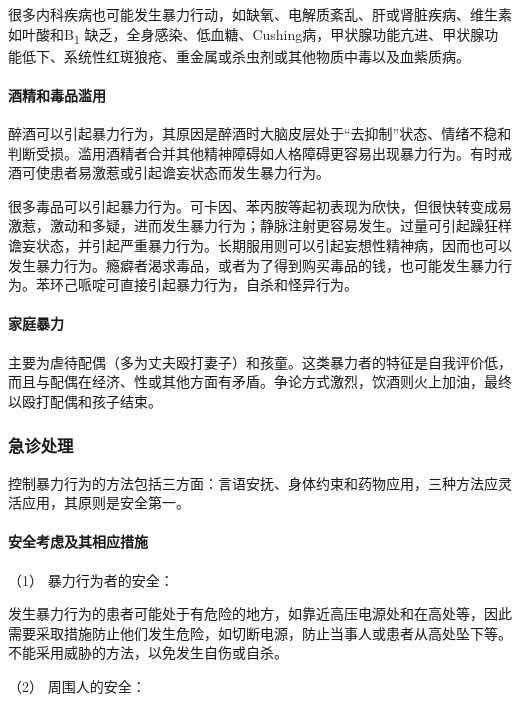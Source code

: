 很多内科疾病也可能发生暴力行动，如缺氧、电解质紊乱、肝或肾脏疾病、维生素如叶酸和B\textsubscript{1}
缺乏，全身感染、低血糖、Cushing病，甲状腺功能亢进、甲状腺功能低下、系统性红斑狼疮、重金属或杀虫剂或其他物质中毒以及血紫质病。

\paragraph{酒精和毒品滥用}

醉酒可以引起暴力行为，其原因是醉酒时大脑皮层处于“去抑制”状态、情绪不稳和判断受损。滥用酒精者合并其他精神障碍如人格障碍更容易出现暴力行为。有时戒酒可使患者易激惹或引起谵妄状态而发生暴力行为。

很多毒品可以引起暴力行为。可卡因、苯丙胺等起初表现为欣快，但很快转变成易激惹，激动和多疑，进而发生暴力行为；静脉注射更容易发生。过量可引起躁狂样谵妄状态，并引起严重暴力行为。长期服用则可以引起妄想性精神病，因而也可以发生暴力行为。瘾癖者渴求毒品，或者为了得到购买毒品的钱，也可能发生暴力行为。苯环己哌啶可直接引起暴力行为，自杀和怪异行为。

\paragraph{家庭暴力}

主要为虐待配偶（多为丈夫殴打妻子）和孩童。这类暴力者的特征是自我评价低，而且与配偶在经济、性或其他方面有矛盾。争论方式激烈，饮酒则火上加油，最终以殴打配偶和孩子结束。

\subsubsection{急诊处理}

控制暴力行为的方法包括三方面：言语安抚、身体约束和药物应用，三种方法应灵活应用，其原则是安全第一。

\paragraph{安全考虑及其相应措施}

\hypertarget{text00054.htmlux5cux23CHP1-18-12-3-1-1}{}
（1） 暴力行为者的安全：

发生暴力行为的患者可能处于有危险的地方，如靠近高压电源处和在高处等，因此需要采取措施防止他们发生危险，如切断电源，防止当事人或患者从高处坠下等。不能采用威胁的方法，以免发生自伤或自杀。

\hypertarget{text00054.htmlux5cux23CHP1-18-12-3-1-2}{}
（2） 周围人的安全：

